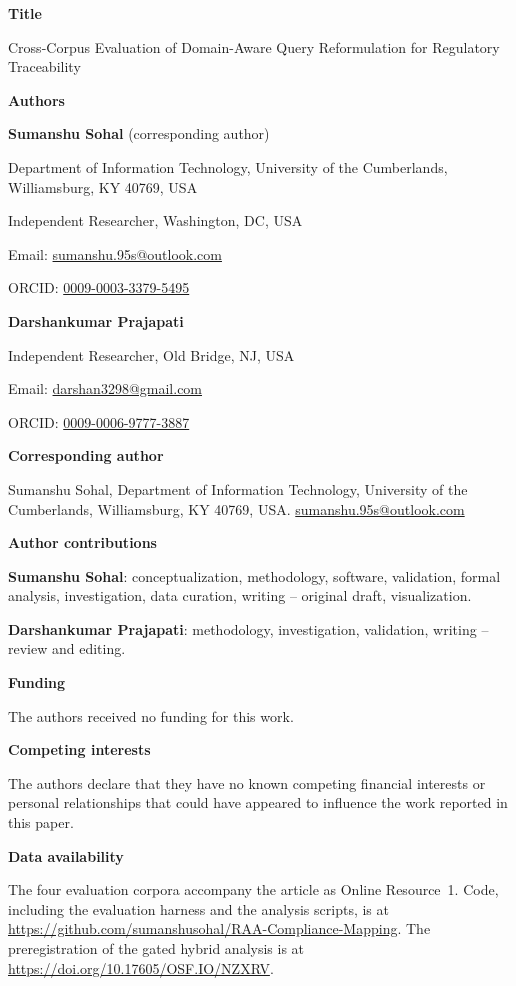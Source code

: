 \documentclass[11pt,a4paper]{article}
\begin{document}
{\large\bfseries Title}

Cross-Corpus Evaluation of Domain-Aware Query Reformulation for Regulatory
Traceability

\vspace{6pt}
{\large\bfseries Authors}

\textbf{Sumanshu Sohal} \hfill (corresponding author)

Department of Information Technology, University of the Cumberlands,
Williamsburg, KY 40769, USA

Independent Researcher, Washington, DC, USA

Email: \href{mailto:sumanshu.95s@outlook.com}{sumanshu.95s@outlook.com}

ORCID: \href{https://orcid.org/0009-0003-3379-5495}{0009-0003-3379-5495}

\vspace{6pt}

\textbf{Darshankumar Prajapati}

Independent Researcher, Old Bridge, NJ, USA

Email: \href{mailto:darshan3298@gmail.com}{darshan3298@gmail.com}

ORCID: \href{https://orcid.org/0009-0006-9777-3887}{0009-0006-9777-3887}

\vspace{6pt}
{\large\bfseries Corresponding author}

Sumanshu Sohal, Department of Information Technology, University of the
Cumberlands, Williamsburg, KY 40769, USA.
\href{mailto:sumanshu.95s@outlook.com}{sumanshu.95s@outlook.com}

\vspace{6pt}
{\large\bfseries Author contributions}

\textbf{Sumanshu Sohal}: conceptualization, methodology, software,
validation, formal analysis, investigation, data curation, writing --
original draft, visualization.

\textbf{Darshankumar Prajapati}: methodology, investigation, validation,
writing -- review and editing.

\vspace{6pt}
{\large\bfseries Funding}

The authors received no funding for this work.

\vspace{6pt}
{\large\bfseries Competing interests}

The authors declare that they have no known competing financial interests or
personal relationships that could have appeared to influence the work
reported in this paper.

\vspace{6pt}
{\large\bfseries Data availability}

The four evaluation corpora accompany the article as Online Resource~1. Code,
including the evaluation harness and the analysis scripts, is at
\url{https://github.com/sumanshusohal/RAA-Compliance-Mapping}. The
preregistration of the gated hybrid analysis is at
\url{https://doi.org/10.17605/OSF.IO/NZXRV}.
\end{document}
